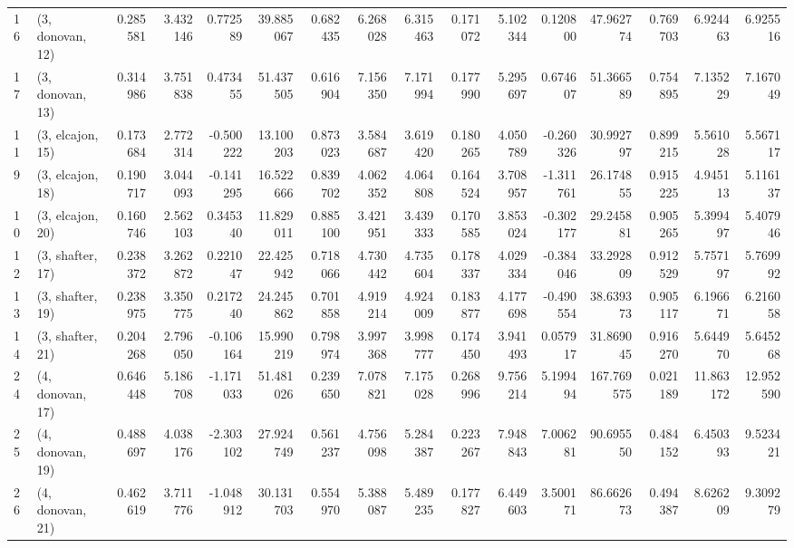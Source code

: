\begin{tabular}{llrrrrrrrrrrrrrr}
16 &  (3, donovan, 12) &   0.285581 &  3.432146 &  0.772589 &  39.885067 &  0.682435 &   6.268028 &  6.315463 &  0.171072 &  5.102344 &  0.120800 &   47.962774 &  0.769703 &   6.924463 &   6.925516 \\
17 &  (3, donovan, 13) &   0.314986 &  3.751838 &  0.473455 &  51.437505 &  0.616904 &   7.156350 &  7.171994 &  0.177990 &  5.295697 &  0.674607 &   51.366589 &  0.754895 &   7.135229 &   7.167049 \\
11 &  (3, elcajon, 15) &   0.173684 &  2.772314 & -0.500222 &  13.100203 &  0.873023 &   3.584687 &  3.619420 &  0.180265 &  4.050789 & -0.260326 &   30.992797 &  0.899215 &   5.561028 &   5.567117 \\
9  &  (3, elcajon, 18) &   0.190717 &  3.044093 & -0.141295 &  16.522666 &  0.839702 &   4.062352 &  4.064808 &  0.164524 &  3.708957 & -1.311761 &   26.174855 &  0.915225 &   4.945113 &   5.116137 \\
10 &  (3, elcajon, 20) &   0.160746 &  2.562103 &  0.345340 &  11.829011 &  0.885100 &   3.421951 &  3.439333 &  0.170585 &  3.853024 & -0.302177 &   29.245881 &  0.905265 &   5.399497 &   5.407946 \\
12 &  (3, shafter, 17) &   0.238372 &  3.262872 &  0.221047 &  22.425942 &  0.718066 &   4.730442 &  4.735604 &  0.178337 &  4.029334 & -0.384046 &   33.292809 &  0.912529 &   5.757197 &   5.769992 \\
13 &  (3, shafter, 19) &   0.238975 &  3.350775 &  0.217240 &  24.245862 &  0.701858 &   4.919214 &  4.924009 &  0.183877 &  4.177698 & -0.490554 &   38.639373 &  0.905117 &   6.196671 &   6.216058 \\
14 &  (3, shafter, 21) &   0.204268 &  2.796050 & -0.106164 &  15.990219 &  0.798974 &   3.997368 &  3.998777 &  0.174450 &  3.941493 &  0.057917 &   31.869045 &  0.916270 &   5.644970 &   5.645268 \\
24 &  (4, donovan, 17) &   0.646448 &  5.186708 & -1.171033 &  51.481026 &  0.239650 &   7.078821 &  7.175028 &  0.268996 &  9.756214 &  5.199494 &  167.769575 &  0.021189 &  11.863172 &  12.952590 \\
25 &  (4, donovan, 19) &   0.488697 &  4.038176 & -2.303102 &  27.924749 &  0.561237 &   4.756098 &  5.284387 &  0.223267 &  7.948843 &  7.006281 &   90.695550 &  0.484152 &   6.450393 &   9.523421 \\
26 &  (4, donovan, 21) &   0.462619 &  3.711776 & -1.048912 &  30.131703 &  0.554970 &   5.388087 &  5.489235 &  0.177827 &  6.449603 &  3.500171 &   86.662673 &  0.494387 &   8.626209 &   9.309279 \\

\end{tabular}
